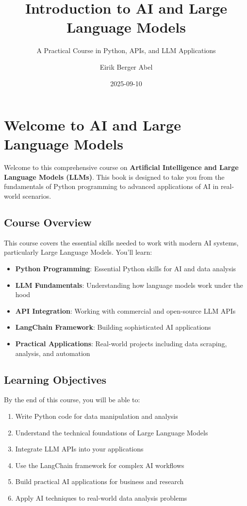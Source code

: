 \documentclass[
]{book}
\title{Introduction to AI and Large Language Models}
\subtitle{A Practical Course in Python, APIs, and LLM Applications}
\author{Eirik Berger Abel}
\date{2025-09-10}
\providecommand{\tightlist}{%
  \setlength{\itemsep}{0pt}\setlength{\parskip}{0pt}}
\begin{document}
\maketitle

{
\setcounter{tocdepth}{1}
\tableofcontents
}
\chapter{Welcome to AI and Large Language Models}\label{welcome-to-ai-and-large-language-models}

Welcome to this comprehensive course on \textbf{Artificial Intelligence and Large Language Models (LLMs)}. This book is designed to take you from the fundamentals of Python programming to advanced applications of AI in real-world scenarios.

\section{Course Overview}\label{course-overview}

This course covers the essential skills needed to work with modern AI systems, particularly Large Language Models. You'll learn:

\begin{itemize}
\tightlist
\item
  \textbf{Python Programming}: Essential Python skills for AI and data analysis
\item
  \textbf{LLM Fundamentals}: Understanding how language models work under the hood
\item
  \textbf{API Integration}: Working with commercial and open-source LLM APIs
\item
  \textbf{LangChain Framework}: Building sophisticated AI applications
\item
  \textbf{Practical Applications}: Real-world projects including data scraping, analysis, and automation
\end{itemize}

\section{Learning Objectives}\label{learning-objectives}

By the end of this course, you will be able to:

\begin{enumerate}
\def\labelenumi{\arabic{enumi}.}
\tightlist
\item
  Write Python code for data manipulation and analysis
\item
  Understand the technical foundations of Large Language Models
\item
  Integrate LLM APIs into your applications
\item
  Use the LangChain framework for complex AI workflows
\item
  Build practical AI applications for business and research
\item
  Apply AI techniques to real-world data analysis problems
\end{enumerate}
\end{document}
